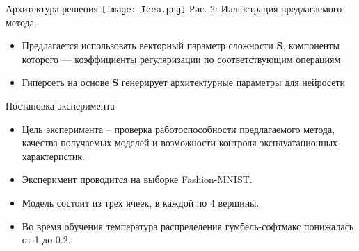\documentclass{beamer}
\begin{document}
\begin{frame}{Архитектура решения}
\texttt{[image: Idea.png]}
\centering
\small Рис. 2: Иллюстрация предлагаемого метода.
\begin{itemize}
    \item Предлагается использовать векторный параметр сложности $\boldsymbol{S}$, компоненты которого --- коэффициенты регуляризации по соответствующим операциям
    \item Гиперсеть на основе $\boldsymbol{S}$ генерирует архитектурные параметры для нейросети
\end{itemize}
\end{frame}




\begin{frame}{Постановка эксперимента}
\begin{itemize}
    \item Цель эксперимента – проверка работоспособности предлагаемого метода, качества получаемых моделей и возможности контроля эксплуатационных характеристик.
    \item Эксперимент проводится на выборке Fashion-MNIST.
    \item Модель состоит из трех ячеек, в каждой по 4 вершины. 
    \item Во время обучения температура распределения гумбель-софтмакс понижалась от 1 до 0.2. %

\end{itemize}
\end{frame}

\end{document}

